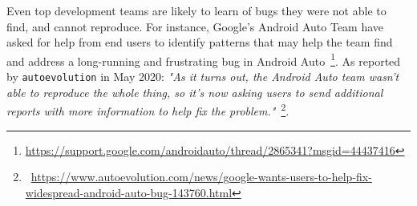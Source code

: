 Even top development teams are likely to learn of bugs they were not able to find, and cannot reproduce. For instance, Google's Android Auto Team have asked for help from end users to identify patterns that may help the team find and address a long-running and frustrating bug in Android Auto~\footnote{\url{https://support.google.com/androidauto/thread/2865341?msgid=44437416}}. As reported by \texttt{autoevolution} in May 2020:  
\emph{"As it turns out, the Android Auto team wasn’t able to reproduce the whole thing, so it’s now asking users to send additional reports with more information to help fix the problem."}~\footnote{~\url{https://www.autoevolution.com/news/google-wants-users-to-help-fix-widespread-android-auto-bug-143760.html}}.

